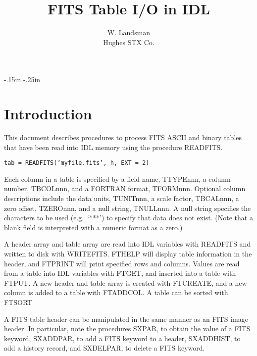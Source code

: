 \topmargin -0.5in
\oddsidemargin-.15in
\evensidemargin-.25in
\textheight 8.5in     
\textwidth 6.5in
\newcommand{\exbegin}{\par\medskip}
\newcommand{\exend}{\medskip\noindent}
\newcommand{\exc}[2]{
\hbox to \hsize{\small\hskip .2in
\parbox[t]{2.8in}{\raggedright\setlength{\parindent}{-.2in}\tt #1}
\hspace{.2in}
\parbox[t]{3.8in}{\raggedright\setlength{\parindent}{-.2in}\rm #2}\hss}
\prevdepth=1.5pt\relax}
\newcommand{\exone}[1]{\begin{center}\tt #1 \end{center}}
\title{FITS Table I/O in IDL}
\author{W. Landsman \\ Hughes STX Co.}

\maketitle
\section{Introduction} 

This document describes procedures to process FITS ASCII and binary tables
that have been read into IDL memory using the procedure READFITS.  

\exone{tab = READFITS('myfile.fits', h, EXT = 2) }

Each column in a table 
is specified by a field name, TTYPEnnn, a column number, TBCOLnnn,
and a FORTRAN format, TFORMnnn.  Optional column descriptions include
the data units, TUNITnnn, a scale factor, TBCALnnn, a zero offset,
TZEROnnn, and a null string, TNULLnnn.  A null string specifies the 
characters to be used (e.g.\  `***') to specify that data does not exist.
(Note that a blank field is interpreted with a numeric format as a zero.) 

A header array and table array are read into IDL variables with READFITS
and written to disk with WRITEFITS.  FTHELP will display table information
in the header, and FTPRINT will print specified rows and columns.  Values
are read from a table into IDL variables with FTGET, and inserted into a
table with FTPUT.  A new header and table array is created with FTCREATE,
and a new column is added to a table with FTADDCOL.  A table can be
sorted with FTSORT

A FITS table header can be manipulated in the same manner as an FITS 
image header.
In particular, note the procedures SXPAR, to obtain the value of a FITS
keyword, SXADDPAR, to add a FITS keyword to a header, SXADDHIST, to add
a history record, and SXDELPAR, to delete a FITS keyword.


